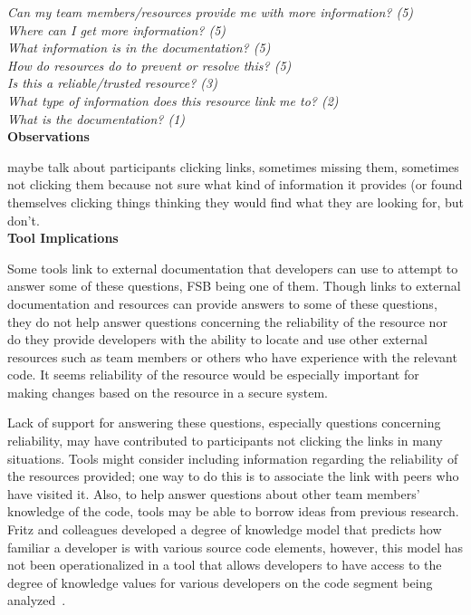 \documentclass[conference]{IEEEtran}
\begin{document}
\noindent\emph{Can my team members/resources provide me with more information? (5)} \\
\emph{Where can I get more information? (5)} \\
\emph{What information is in the documentation? (5)} \\
\emph{How do resources do to prevent or resolve this? (5)} \\
\emph{Is this a reliable/trusted resource? (3)} \\
\emph{What type of information does this resource link me to? (2)} \\
\emph{What is the documentation? (1)} \\



\noindent\textbf{Observations}

maybe talk about participants clicking links, sometimes missing them, sometimes not clicking them because not sure what kind of information it provides (or found themselves clicking things thinking they would find what they are looking for, but don't.
\\

\noindent\textbf{Tool Implications}

Some tools link to external documentation that developers can use to attempt to answer some of these questions, FSB being one of them. 
Though links to external documentation and resources can provide answers to some of these questions, they do not help answer questions concerning the reliability of the resource nor do they provide developers with the ability to locate and use other external resources such as team members or others who have experience with the relevant code.
It seems reliability of the resource would be especially important for making changes based on the resource in a secure system.

Lack of support for answering these questions, especially questions concerning reliability, may have contributed to participants not clicking the links in many situations.  
Tools might consider including information regarding the reliability of the resources provided; one way to do this is to associate the link with peers who have visited it.
Also, to help answer questions about other team members' knowledge of the code, tools may be able to borrow ideas from previous research.
Fritz and colleagues developed a degree of knowledge model that predicts how familiar a developer is with various source code elements, however, this model has not been operationalized in a tool that allows developers to have access to the degree of knowledge values for various developers on the code segment being analyzed~\cite{fritz2010degree}.
\end{document}
